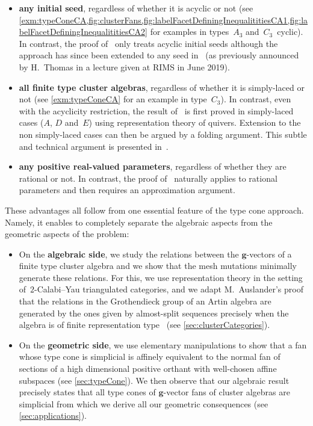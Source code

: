 \documentclass{amsart}
\theoremstyle{definition}
\renewcommand{\b}[1]{{\boldsymbol{#1}}} %
\begin{document}
\smallskip
\begin{itemize}
\item \textbf{any initial seed}, regardless of whether it is acyclic or not (see \cref{exm:typeConeCA,fig:clusterFans,fig:labelFacetDefiningInequalititiesCA1,fig:labelFacetDefiningInequalititiesCA2} for examples in types~$A_3$ and~$C_3$~cyclic). In contrast, the proof of~\cite{BazierMatteChapelierLaguetDouvilleMousavandThomasYildirim} only treats acyclic initial seeds although the approach has since been extended to any seed in~\cite{BazierMatte-thesis} (as previously announced by H.~Thomas in a lecture given at RIMS in June 2019).

\smallskip
\item \textbf{all finite type cluster algebras}, regardless of whether it is simply-laced or not (see \cref{exm:typeConeCA} for an example in type~$C_3$). In contrast, even with the acyclicity restriction, the result of~\cite{BazierMatteChapelierLaguetDouvilleMousavandThomasYildirim} is first proved in simply-laced cases ($A$, $D$ and~$E$) using representation theory of quivers. Extension to the non simply-laced cases can then be argued by a folding argument. This subtle and technical argument is presented in~\cite{ArkaniHamedHeLam}.

\smallskip
\item \textbf{any positive real-valued parameters}, regardless of whether they are rational or not. In contrast, the proof of~\cite{BazierMatteChapelierLaguetDouvilleMousavandThomasYildirim} naturally applies to rational parameters and then requires an approximation argument.
\end{itemize}

\smallskip
\noindent
These advantages all follow from one essential feature of the type cone approach.
Namely, it enables to completely separate the algebraic aspects from the geometric aspects of the problem:
\begin{itemize}
\item On the \textbf{algebraic side}, we study the relations between the $\b{g}$-vectors of a finite type cluster algebra and we show that the mesh mutations minimally generate these relations.
For this, we use representation theory in the setting of~$2$-Calabi--Yau triangulated categories, and we adapt M.~Auslander's proof that the relations in the Grothendieck group of an Artin algebra are generated by the ones given by almost-split sequences precisely when the algebra is of finite representation type~\cite{Auslander1984} (see \cref{sec:clusterCategories}).

\smallskip
\item On the \textbf{geometric side}, we use elementary manipulations to show that a fan whose type cone is simplicial is affinely equivalent to the normal fan of sections of a high dimensional positive orthant with well-chosen affine subspaces (see \cref{sec:typeCone}). We then observe that our algebraic result precisely states that all type cones of $\b{g}$-vector fans of cluster algebras are simplicial from which we derive all our geometric consequences (see \cref{sec:applications}).
\end{itemize}
\end{document}
